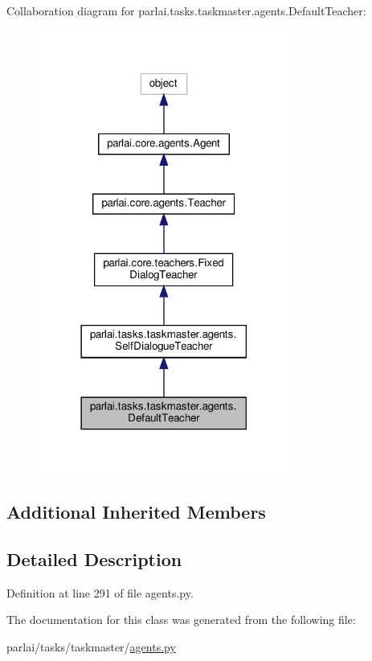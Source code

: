 Collaboration diagram for parlai.\+tasks.\+taskmaster.\+agents.\+Default\+Teacher\+:
\nopagebreak
\begin{figure}[H]
\begin{center}
\leavevmode
\includegraphics[width=234pt]{classparlai_1_1tasks_1_1taskmaster_1_1agents_1_1DefaultTeacher__coll__graph}
\end{center}
\end{figure}
\subsection*{Additional Inherited Members}


\subsection{Detailed Description}


Definition at line 291 of file agents.\+py.



The documentation for this class was generated from the following file\+:\begin{DoxyCompactItemize}
\item 
parlai/tasks/taskmaster/\hyperlink{parlai_2tasks_2taskmaster_2agents_8py}{agents.\+py}\end{DoxyCompactItemize}
